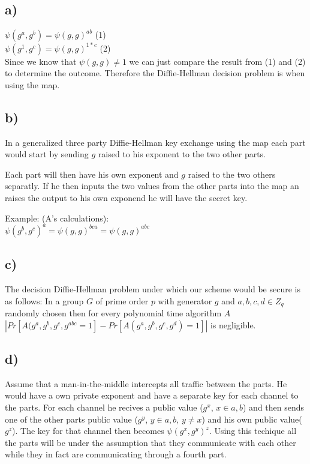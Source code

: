 \documentclass[a4paper,11pt]{article}
\begin{document}
	\subsection*{a)}

	$ \psi(g^a, g^b) = \psi(g, g)^{ab}$ (1)\\
	$ \psi(g^1, g^c) = \psi(g, g)^{1*c}$ (2)\\
	Since we know that $\psi(g, g) \neq 1$ we can just compare the result from (1) and (2) to determine the outcome. 
	Therefore the Diffie-Hellman decision problem is when using the map.

	\subsection*{b) }
	In a generalized three party Diffie-Hellman key exchange using the map each part would 
	start by sending $g$ raised to his exponent to the two other parts.

	Each part will then have his own exponent and $g$ raised to the two others separatly.
	If he then inputs the two values from the other parts into the map an raises the output
	to his own exponend he will have the secret key.

	Example: (A's calculations):\\
	$ \psi(g^b, g^c)^a = \psi(g, g)^{bca} = \psi(g, g)^{abc} $

	\subsection*{c) }
	The decision Diffie-Hellman problem under which our scheme would be secure is as follows:
	In a group $G$ of prime order $p$ with generator $g$ and $a, b, c, d \in Z_q$ randomly chosen then for every polynomial time algorithm $A$\\
	$|Pr [ A(g^a, g^b, g^c, g^{abc} = 1 ] - Pr [ A(g^a, g^b, g^c, g^d) = 1] | $ is negligible.

	\subsection*{d) }
	Assume that a man-in-the-middle intercepts all traffic between the parts. He would have a
	own private exponent and have a separate key for each channel to the parts. For each channel
	he recives a public value ($g^x$, $x \in {a, b}$) and then sends one of the other parts public value ($g^y$, $y \in {a,b}$, $y \neq x$) and his own public value($g^z$). 
	The key for that channel then becomes $\psi(g^x, g^y)^z$. Using this techique all the parts
	will be under the assumption that they communicate with each other while they in fact are
	communicating through a fourth part.
\end{document}
